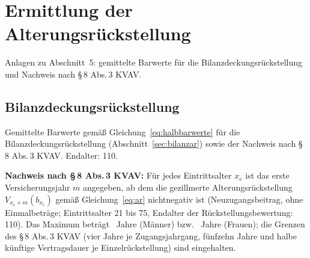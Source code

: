 \section{Ermittlung der Alterungsrückstellung}\label{sec:anlagenteil5}

Anlagen zu Abschnitt~5: gemittelte Barwerte für die
Bilanzdeckungsrückstellung und Nachweis nach \S\,8 Abs.\,3 KVAV.

\setcounter{subsection}{1}
\subsection{Bilanzdeckungsrückstellung}\label{sec:anlage521}

\label{sec:anlage522}%
Gemittelte Barwerte gemäß Gleichung~\eqref{eq:halbbarwerte} für die
Bilanzdeckungsrückstellung (Abschnitt~\ref{sec:bilanzar}) sowie der
Nachweis nach \S\,8 Abs.\,3 KVAV. Endalter: 110.



\clearpage
\textbf{Nachweis nach \S\,8 Abs.\,3 KVAV:} Für jedes Eintrittsalter
$x_e$ ist das erste Versicherungsjahr $m$ angegeben, ab dem die
gezillmerte Alterungsrückstellung $V_{x_e+m}(b_{x_e})$ gemäß
Gleichung~\eqref{eq:ar} nichtnegativ ist (Neuzugangsbeitrag, ohne
Einmalbeträge; Eintrittsalter 21 bis 75, Endalter der
Rückstellungsbewertung: 110). Das Maximum beträgt \MaxNegM~Jahre
(Männer) bzw. \MaxNegF~Jahre (Frauen); die Grenzen des \S\,8 Abs.\,3
KVAV (vier Jahre je Zugangsjahrgang, fünfzehn Jahre und halbe künftige
Vertragsdauer je Einzelrückstellung) sind eingehalten.


